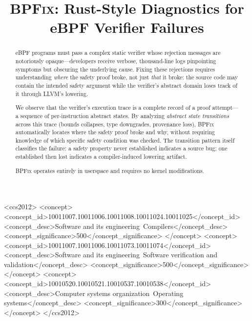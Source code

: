\documentclass[sigplan,10pt,anonymous,review]{acmart}
\newcommand{\sys}{\textsc{BPFix}\xspace}
\begin{document}
\title{\sys: Rust-Style Diagnostics for eBPF Verifier Failures}

\begin{CCSXML}
<ccs2012>
   <concept>
       <concept_id>10011007.10011006.10011008.10011024.10011025</concept_id>
       <concept_desc>Software and its engineering~Compilers</concept_desc>
       <concept_significance>500</concept_significance>
   </concept>
   <concept>
       <concept_id>10011007.10011006.10011073.10011074</concept_id>
       <concept_desc>Software and its engineering~Software verification and validation</concept_desc>
       <concept_significance>500</concept_significance>
   </concept>
   <concept>
       <concept_id>10010520.10010521.10010537.10010538</concept_id>
       <concept_desc>Computer systems organization~Operating systems</concept_desc>
       <concept_significance>300</concept_significance>
   </concept>
</ccs2012>
\end{CCSXML}


\begin{abstract}
eBPF programs must pass a complex static verifier whose rejection messages
are notoriously opaque---developers receive verbose, thousand-line logs
pinpointing symptoms but obscuring the underlying cause.
Fixing these rejections requires understanding \emph{where} the safety
proof broke, not just \emph{that} it broke: the source code may contain the
intended safety argument while the verifier's abstract domain loses track of it
through LLVM's lowering.

We observe that the verifier's execution trace is a complete record of a
proof attempt---a sequence of per-instruction abstract states.  By analyzing
\emph{abstract state transitions} across this trace (bounds collapses, type
downgrades, provenance loss), \sys automatically locates where the safety
proof broke and why, without requiring knowledge of which specific safety
condition was checked.  The transition pattern itself classifies the failure:
a safety property never established indicates a source bug; one established
then lost indicates a compiler-induced lowering artifact.

\sys operates entirely in userspace and requires no kernel modifications.
\end{abstract}
\end{document}
